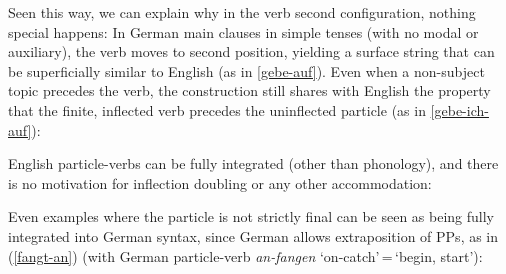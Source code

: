 \documentclass[output=paper]{langscibook}
\begin{document}
Seen this way, we can explain why in the verb second configuration, nothing special happens: In German main clauses in simple tenses (with no modal or auxiliary), the verb moves to second position, yielding a surface string that can be superficially similar to English (as in \ref{gebe-auf}). Even when a non-subject topic precedes the verb, the construction still shares with English the property that the finite, inflected verb precedes the uninflected particle (as in \ref{gebe-ich-auf}):

\ea
{}
\z\z 

English particle-verbs can be fully integrated (other than phonology), and there is no motivation for inflection doubling or any other accommodation:

\ea\label{v2-verb-particlea}
\z\z 

Even examples where the particle is not strictly final can be seen as being fully integrated into German syntax, since German allows extraposition of PPs, as in (\ref{fangt-an}) (with German particle-verb \textit{an-fangen} `on-catch'\,=\,`begin, start'):\largerpage

\ea\label{kickt-off}
\z\z 
\end{document}
